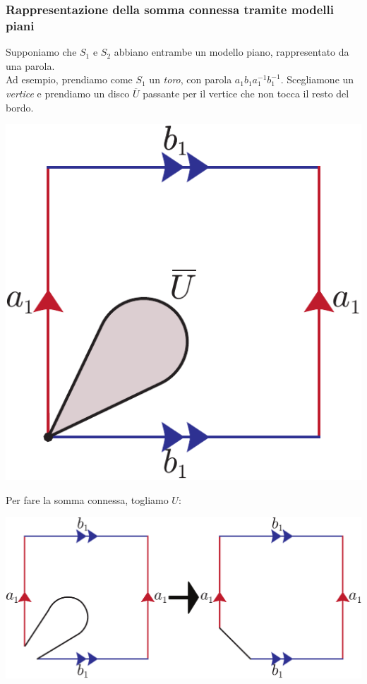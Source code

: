 \subsubsection{Rappresentazione della somma connessa tramite modelli piani}
\vspace{-3mm}
\begin{minipage}{.74\linewidth}
Supponiamo che $S_1$ e $S_2$ abbiano entrambe un modello piano, rappresentato da una parola.\\
Ad esempio, prendiamo come $S_1$ un \textit{toro}, con parola $a_1b_1a_1^{-1}b_1^{-1}$. Scegliamone un \textit{vertice} e prendiamo un disco $\overline{U}$ passante per il vertice che non tocca il resto del bordo.
\end{minipage}
\begin{minipage}{.25\linewidth}
\begin{center}
	\includegraphics[trim=0cm 0cm 0cm 0cm, clip, scale=0.4]{images/torusmodelconnect1.pdf}
\end{center}
\end{minipage}
Per fare la somma connessa, togliamo $U$:
\vspace{-3mm}
\begin{center}
	\includegraphics[trim=0cm 0cm 0cm 0cm, clip, scale=0.35]{images/torusmodelconnect2.pdf}
\end{center}
